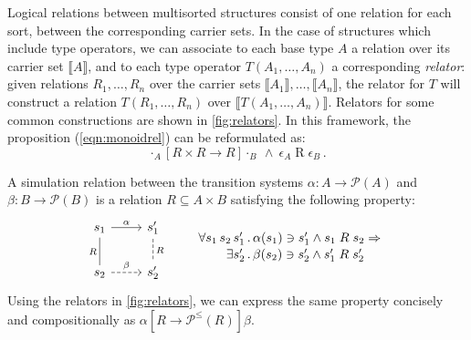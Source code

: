 \documentclass[sigplan,screen]{acmart}
\newcommand{\ifr}[1]{\mathrel{[{#1}]}}
\begin{document}
Logical relations between multisorted structures
consist of one relation for each sort,
between the corresponding carrier sets.
In the case of structures which include type operators,
we can associate to each base type $A$
a relation over its carrier set $\llbracket A \rrbracket$,
and to each type operator $T(A_1, \ldots, A_n)$
a corresponding \emph{relator}:
given relations $R_1, \ldots, R_n$ over
the carrier sets $\llbracket A_1 \rrbracket, \ldots, \llbracket A_n \rrbracket$,
the relator for $T$
will construct a relation $T(R_1, \ldots, R_n)$
over $\llbracket T(A_1, \ldots, A_n) \rrbracket$.
Relators for some common constructions are shown in \autoref{fig:relators}.
In this framework, the proposition (\ref{eqn:monoidrel}) can be reformulated as:
\[
  \cdot_A \ifr{R \times R \rightarrow R} \cdot_B
  \: \wedge \:
  \epsilon_A \mathrel{R} \epsilon_B \,.
\]

\begin{example} \label{ex:simrel} %
A simulation relation
between the transition systems
$\alpha : A \rightarrow \mathcal{P}(A)$ and
$\beta : B \rightarrow \mathcal{P}(B)$
is a relation $R \subseteq A \times B$
satisfying the following property:
\[
  \begin{tikzcd}[scale=0.8]
    s_1 \arrow[r, "\alpha"]
        \arrow[d, dash, "R"'] &
    s_1' \arrow[d, dashed, dash, "R"] \\
    s_2 \arrow[r, dashed, "\beta"] &
    s_2'
  \end{tikzcd}
  \qquad
  \label{eqn:simrel}
  \begin{array}{r@{\,.\,}l}
    \forall s_1 \, s_2 \, s_1' &
      \alpha(s_1) \ni s_1' \wedge s_1 \mathrel{R} s_2 \Rightarrow
    \\[0.25ex]
    \exists s_2' &
      \beta(s_2) \ni s_2' \wedge s_1' \mathrel{R} s_2'
  \end{array}
\]
Using the relators in \autoref{fig:relators},
we can express the same property
concisely and compositionally as
$
  \alpha \ifr{R \rightarrow \mathcal{P}^\le(R)} \beta
$.
\end{example}
\end{document}
